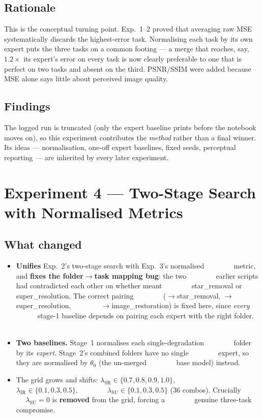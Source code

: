 \subsection*{Rationale}
This is the conceptual turning point. Exp.~1--2 proved that averaging raw MSE
systematically discards the highest-error task. Normalising each task by its own
expert puts the three tasks on a common footing --- a merge that reaches, say,
$1.2\times$ its expert's error on every task is now clearly preferable to one
that is perfect on two tasks and absent on the third. PSNR/SSIM were added
because MSE alone says little about perceived image quality.

\subsection*{Findings}
The logged run is truncated (only the  expert baseline
prints before the notebook moves on), so this experiment contributes the
\emph{method} rather than a final winner. Its ideas --- normalisation, one-off
expert baselines, fixed seeds, perceptual reporting --- are inherited by every
later experiment.

\section{Experiment 4 --- Two-Stage Search with Normalised Metrics}

\subsection*{What changed}
\begin{itemize}[nosep,leftmargin=1.4em]
   \item \textbf{Unifies} Exp.~2's two-stage search with Exp.~3's normalised
         metric, and \textbf{fixes the folder$\to$task mapping bug}: the two
         earlier scripts had contradicted each other on whether  meant
         star\_removal or super\_resolution. The correct pairing
         ($\to$star\_removal, $\to$super\_resolution,
         $\to$image\_restoration) is fixed here, since \emph{every}
         stage-1 baseline depends on pairing each expert with the right folder.
   \item \textbf{Two baselines.} Stage~1 normalises each single-degradation
         folder by its \emph{expert}. Stage~2's combined folders have no single
         expert, so they are normalised by \textbf{$\theta_0$} (the un-merged
         base model) instead.
   \item The grid grows and shifts: $\lambda_{\mathrm{SR}}\in\{0.7,0.8,0.9,1.0\}$,
         $\lambda_{\mathrm{IR}}\in\{0.1,0.3,0.5\}$,
         $\lambda_{\mathrm{SU}}\in\{0.1,0.3,0.5\}$ (36 combos). Crucially
         $\lambda_{\mathrm{SU}}=0$ is \textbf{removed} from the grid, forcing a
         genuine three-task compromise.
\end{itemize}

